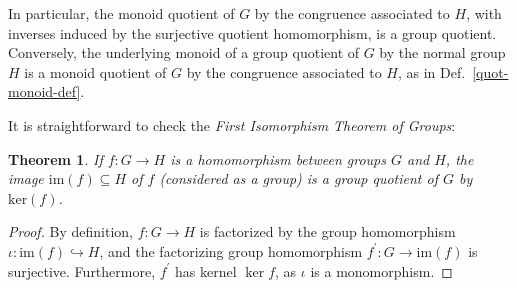 \documentclass{amsart}
\theoremstyle{plain}
\newtheorem{thm}{Theorem}[section]
\numberwithin{equation}{section} %
\numberwithin{figure}{section} %
\theoremstyle{plain}
\theoremstyle{plain}
\theoremstyle{plain}
\theoremstyle{plain}
\theoremstyle{plain}
\theoremstyle{plain}
\theoremstyle{remark}
\theoremstyle{remark}
\theoremstyle{remark}
\begin{document}
In particular, the monoid quotient of $G$ by the congruence associated to $H$, with inverses induced by the surjective quotient homomorphism, is a group quotient.
Conversely, the underlying monoid of a group quotient of $G$ by the normal group $H$ is a monoid quotient of $G$ by the congruence associated to $H$, as in Def.~\ref{quot-monoid-def}. 

It is straightforward to check the \textit{First Isomorphism Theorem of Groups}:
\begin{thm} \label{first-iso-grp-thm}   %
If $f : G \rightarrow H$ is a homomorphism between groups $G$ and $H$, the image $\mathrm{im}(f) \subseteq H$ of $f$ (considered as a group) is a group quotient of $G$ by $\mathrm{ker}(f)$. 
\end{thm}
\begin{proof}
By definition, $f : G \rightarrow H$ is factorized by the group homomorphism $\iota : \mathrm{im}(f) \hookrightarrow H$, and the factorizing group homomorphism $f^\prime : G \rightarrow \mathrm{im}(f)$ is surjective. Furthermore, $f^\prime$ has kernel $\ker f$, as $\iota$ is a monomorphism.
\end{proof}
\end{document}
